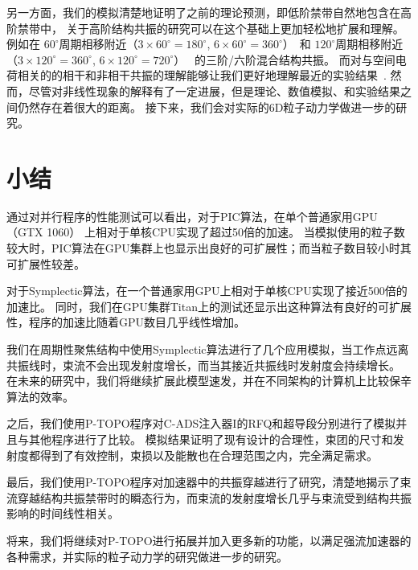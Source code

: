 另一方面，我们的模拟清楚地证明了之前的理论预测，即低阶禁带自然地包含在高阶禁带中，
关于高阶结构共振的研究可以在这个基础上更加轻松地扩展和理解。
例如在 $60^{\circ}$周期相移附近（$3 \times 60^{\circ} = 180^{\circ}$, $6 \times 60^{\circ} = 360^{\circ}$）~\cite{16}和 $120^{\circ}$周期相移附近（$3 \times 120^{\circ} = 360^{\circ}$, $6 \times 120^{\circ} = 720^{\circ}$）~\cite{11,36}
的三阶/六阶混合结构共振。
而对与空间电荷相关的的相干和非相干共振的理解能够让我们更好地理解最近的实验结果~\cite{31,32,33}.
然而，尽管对非线性现象的解释有了一定进展，但是理论、数值模拟、和实验结果之间仍然存在着很大的距离。
接下来，我们会对实际的6D粒子动力学做进一步的研究。

\section{小结}                    \label{section:Simulation_conclusion}
通过对并行程序的性能测试可以看出，对于PIC算法，在单个普通家用GPU （GTX 1060） 上相对于单核CPU实现了超过50倍的加速。
当模拟使用的粒子数较大时，PIC算法在GPU集群上也显示出良好的可扩展性；而当粒子数目较小时其可扩展性较差。

对于Symplectic算法，在一个普通家用GPU上相对于单核CPU实现了接近500倍的加速比。
同时，我们在GPU集群Titan上的测试还显示出这种算法有良好的可扩展性，程序的加速比随着GPU数目几乎线性增加。

我们在周期性聚焦结构中使用Symplectic算法进行了几个应用模拟，当工作点远离共振线时，束流不会出现发射度增长，而当其接近共振线时发射度会持续增长。
在未来的研究中，我们将继续扩展此模型速发，并在不同架构的计算机上比较保辛算法的效率。

之后，我们使用P-TOPO程序对C-ADS注入器I的RFQ和超导段分别进行了模拟并且与其他程序进行了比较。
模拟结果证明了现有设计的合理性，束团的尺寸和发射度都得到了有效控制，束损以及能散也在合理范围之内，完全满足需求。

最后，我们使用P-TOPO程序对加速器中的共振穿越进行了研究，清楚地揭示了束流穿越结构共振禁带时的瞬态行为，而束流的发射度增长几乎与束流受到结构共振影响的时间线性相关。

将来，我们将继续对P-TOPO进行拓展并加入更多新的功能，以满足强流加速器的各种需求，并实际的粒子动力学的研究做进一步的研究。